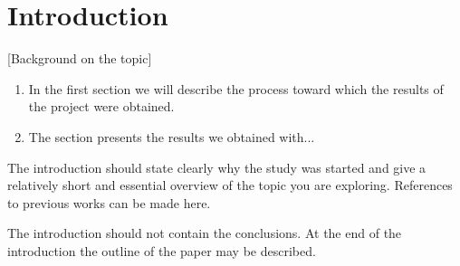 \section{Introduction}
[Background on the topic]

\begin{enumerate}
\item In the first section we will describe the process toward which the results of the project were obtained.
\item The section presents the results we obtained with...
\end{enumerate}

The introduction should state clearly why the study was started
and give a relatively short and essential overview of the topic
you are exploring. References to previous works can be made here.
 
The introduction should not contain the conclusions. 
At the end of the introduction the outline of the paper may be described.